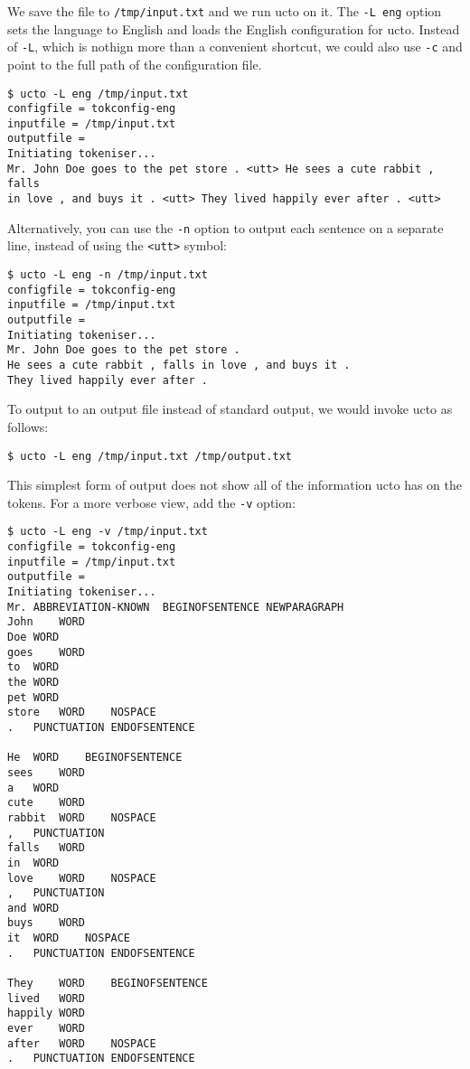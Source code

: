 \documentclass[a4paper,12pt]{report}
\begin{document}
We save the file to \texttt{/tmp/input.txt} and we run ucto on it. The
\texttt{-L eng} option sets the language to English and loads the English configuration for ucto. Instead of \texttt{-L}, which is nothign more than a convenient shortcut, we could also use \texttt{-c} and point to the full path of the configuration file.

\begin{verbatim}
$ ucto -L eng /tmp/input.txt
configfile = tokconfig-eng
inputfile = /tmp/input.txt
outputfile = 
Initiating tokeniser...
Mr. John Doe goes to the pet store . <utt> He sees a cute rabbit , falls 
in love , and buys it . <utt> They lived happily ever after . <utt> 
\end{verbatim}

Alternatively, you can use the \texttt{-n} option to output each sentence on a separate line, instead of using the \texttt{<utt>} symbol:

\begin{verbatim}
$ ucto -L eng -n /tmp/input.txt
configfile = tokconfig-eng
inputfile = /tmp/input.txt
outputfile = 
Initiating tokeniser...
Mr. John Doe goes to the pet store .
He sees a cute rabbit , falls in love , and buys it .
They lived happily ever after .
\end{verbatim}

To output to an output file instead of standard output, we would invoke ucto as follows:

\begin{verbatim}
$ ucto -L eng /tmp/input.txt /tmp/output.txt 
\end{verbatim}

This simplest form of output does not show all of the information ucto has on the tokens. For a more verbose view, add the \texttt{-v} option:

\begin{verbatim}
$ ucto -L eng -v /tmp/input.txt
configfile = tokconfig-eng
inputfile = /tmp/input.txt
outputfile = 
Initiating tokeniser...
Mr.	ABBREVIATION-KNOWN	BEGINOFSENTENCE NEWPARAGRAPH 
John	WORD	
Doe	WORD	
goes	WORD	
to	WORD	
the	WORD	
pet	WORD	
store	WORD	NOSPACE 
.	PUNCTUATION	ENDOFSENTENCE 

He	WORD	BEGINOFSENTENCE 
sees	WORD	
a	WORD	
cute	WORD	
rabbit	WORD	NOSPACE 
,	PUNCTUATION	
falls	WORD	
in	WORD	
love	WORD	NOSPACE 
,	PUNCTUATION	
and	WORD	
buys	WORD	
it	WORD	NOSPACE 
.	PUNCTUATION	ENDOFSENTENCE 

They	WORD	BEGINOFSENTENCE 
lived	WORD	
happily	WORD	
ever	WORD	
after	WORD	NOSPACE 
.	PUNCTUATION	ENDOFSENTENCE 
\end{verbatim}
\end{document}
